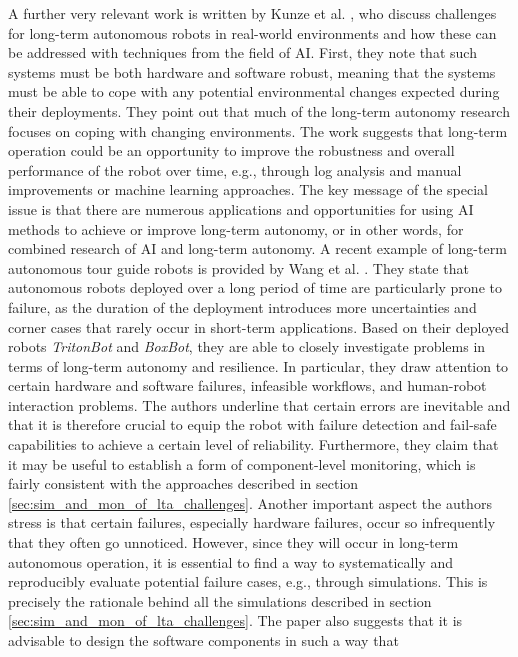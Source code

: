 \documentclass[english, master, utf8]{base/thesis_KBS}
\begin{document}
A further very relevant work is written by Kunze et al. \cite{KunzeSI:2018}, who discuss challenges for long-term autonomous robots in real-world environments and how these can be addressed with techniques from the field of AI.
First, they note that such systems must be both hardware and software robust, meaning that the systems must be able to cope with any potential environmental changes expected
during their deployments. \cite{KunzeSI:2018} They point out that much of the long-term autonomy research focuses on coping with changing environments. The work suggests that
long-term operation could be an opportunity to improve the robustness and overall performance of the robot over time, e.g., through log analysis and manual improvements or machine
learning approaches. The key message of the special issue is that there are numerous applications and opportunities for using AI methods to achieve or improve long-term autonomy,
or in other words, for combined research of AI and long-term autonomy.\newline
A recent example of long-term autonomous tour guide robots is provided by Wang et al. \cite{Wang:2018}. They state that autonomous robots deployed over a long period of time are
particularly prone to failure, as the duration of the deployment introduces more uncertainties and corner cases that rarely occur in short-term applications. Based on their deployed
robots \textit{TritonBot} and \textit{BoxBot}, they are able to closely investigate problems in terms of long-term autonomy and resilience. In particular, they draw attention to
certain hardware and software failures, infeasible workflows, and human-robot interaction problems. The authors underline that certain errors are inevitable and that it is therefore
crucial to equip the robot with failure detection and fail-safe capabilities to achieve a certain level of reliability. Furthermore, they claim that it may be useful to establish a form
of component-level monitoring, which is fairly consistent with the approaches described in section \ref{sec:sim_and_mon_of_lta_challenges}. Another important aspect the authors
stress is that certain failures, especially hardware failures, occur so infrequently that they often go unnoticed. However, since they will occur in long-term autonomous operation,
it is essential to find a way to systematically and reproducibly evaluate potential failure cases, e.g., through simulations. \cite{Wang:2018} This is precisely the rationale behind
all the simulations described in section \ref{sec:sim_and_mon_of_lta_challenges}. The paper also suggests that it is advisable to design the software components in such a way that
\end{document}
